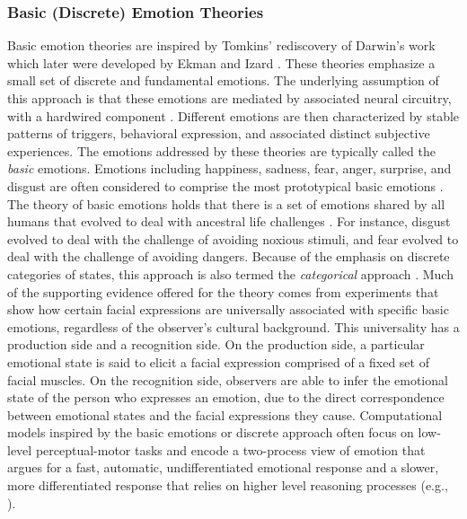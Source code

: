 \documentclass[12pt]{report}
\begin{document}
\subsubsection{Basic (Discrete) Emotion Theories}
\label{sec:discrete-emotions}

Basic emotion theories are inspired by Tomkins' \cite{tomkins:affect}
rediscovery of Darwin's work
\cite{darwin:emotion-expression,hess:darwin-emotion} which later were developed
by Ekman \cite{ekman:argument-emotions} and Izard \cite{izard:human-emotions}.
These theories emphasize a small set of discrete and fundamental emotions.
The underlying assumption of this approach is that these emotions are mediated
by associated neural circuitry, with a hardwired component
\cite{ekman:argument-emotions}. Different emotions are then characterized by
stable patterns of triggers, behavioral expression, and associated distinct
subjective experiences. The emotions addressed by these theories are typically
called the \textit{basic} emotions. Emotions including happiness, sadness, fear,
anger, surprise, and disgust are often considered to comprise the most
prototypical basic emotions \cite{ekman:argument-emotions}. The theory of basic
emotions holds that there is a set of emotions shared by all humans that evolved
to deal with ancestral life challenges \cite{ekman:argument-emotions}. For
instance, disgust evolved to deal with the challenge of avoiding noxious
stimuli, and fear evolved to deal with the challenge of avoiding dangers.
Because of the emphasis on discrete categories of states, this approach is also
termed the \textit{categorical} approach \cite{panskepp:affective-neuroscience}.
Much of the supporting evidence offered for the theory comes from experiments
that show how certain facial expressions are universally associated with
specific basic emotions, regardless of the observer's cultural background. This
universality has a production side and a recognition side. On the production
side, a particular emotional state is said to elicit a facial expression
comprised of a fixed set of facial muscles. On the recognition side, observers
are able to infer the emotional state of the person who expresses an emotion,
due to the direct correspondence between emotional states and the facial
expressions they cause. Computational models inspired by the basic emotions or
discrete approach often focus on low-level perceptual-motor tasks and encode a
two-process view of emotion that argues for a fast, automatic, undifferentiated
emotional response and a slower, more differentiated response that relies on
higher level reasoning processes (e.g.,
\cite{armony:computational-modeling-emotion}). \\
\end{document}
